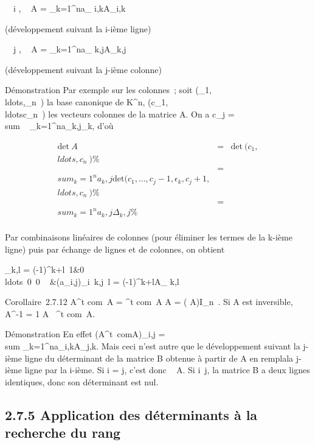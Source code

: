 \documentclass[]{article}
\begin{document}
\forall~~i \in [1,n],\quad
{}~ A =
\sum _k=1^na_
i,kA_i,k

(développement suivant la i-ième ligne)

\forall~~j \in [1,n],\quad
{}~ A =
\sum _k=1^na_
k,jA_k,j

(développement suivant la j-ième colonne)

Démonstration Par exemple sur les colonnes~; soit
(\epsilon_1,\\ldots,\epsilon_n~)
la base canonique de K^n,
(c_1,\\ldotsc_n~)
les vecteurs colonnes de la matrice A. On a c_j
= \\sum ~
_k=1^na_k,j\epsilon_k, d'où

\begin{align*}
\mathrm{det}~ A& =&
\mathrm{det}~
(c_1,\\ldots,c_n~)
\%& \\ & =& \\sum
_k=1^na_ k,j \mathrm{det}
(c_1,\ldots,c_j-1,\epsilon_k,c_j+1,\\ldots,c_n~)\%&
\\ & =& \\sum
_k=1^na_ k,j\Delta_k,j \%&
\\ \end{align*}

Par combinaisons linéaires de colonnes (pour éliminer les termes de la
k-ième ligne) puis par échange de lignes et de colonnes, on obtient

\Delta_k,l = (-1)^k+l\left
\matrix\,1&0\\ldots~0
\cr \matrix\,0
\cr \⋮~
&(a_i,j)_i\neq~k,j\mathrel\neq~l\right
 = (-1)^k+lA_ k,l

Corollaire~2.7.12 A^t com~A =
^t com~A A =
( A)I_n~.
Si A est inversible, A^-1 = 1 \over
{} A~
^t com~A.

Démonstration En effet (A^t\
comA)_i,j =\ \\sum
 _k=1^na_i,kA_j,k. Mais ceci n'est
autre que le développement suivant la j-ième ligne du déterminant de la
matrice B obtenue à partir de A en rempla\ccant la
j-ième ligne par la i-ième. Si i = j, c'est donc
~ A. Si
i\neq~j, la matrice B a deux lignes identiques,
donc son déterminant est nul.

\subsection{2.7.5 Application des déterminants à la recherche du rang}
\end{document}
